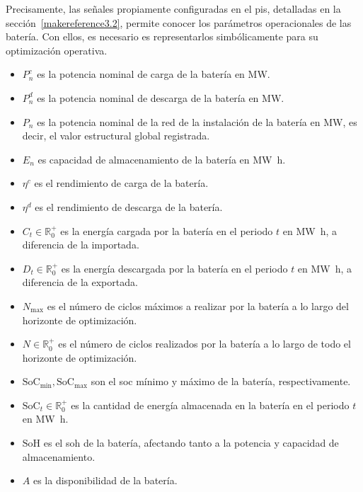 Precisamente, las señales propiamente configuradas en el \gls{pis}, detalladas en la sección~\ref{makereference3.2}, permite conocer los parámetros operacionales de las batería. Con ellos, es necesario es representarlos simbólicamente para su optimización operativa.

\begin{itemize}

  \item \( P^{c}_{n} \) es la potencia nominal de carga de la batería en \si{\mega\watt}.

  \item \( P^{d}_{n} \) es la potencia nominal de descarga de la batería en \si{\mega\watt}.

  \item \( P_{n} \) es la potencia nominal de la red de la instalación de la batería en \si{\mega\watt}, es decir, el valor estructural global registrada.

  \item \( E_{n} \) es capacidad de almacenamiento de la batería en \si{{\mega\watt\hour}}.

  \item \( \eta^{c} \) es el rendimiento de carga de la batería.

  \item \( \eta^{d} \) es el rendimiento de descarga de la batería.

  \item \( C_{t} \in \mathbb{R}^{+}_{0} \) es la energía cargada por la batería en el periodo \( t \) en \si{{\mega\watt\hour}}, a diferencia de la importada.

  \item \( D_{t} \in \mathbb{R}^{+}_{0} \) es la energía descargada por la batería en el periodo \( t \) en \si{{\mega\watt\hour}}, a diferencia de la exportada.

  \item \( N_{\text{max}} \) es el número de ciclos máximos a realizar por la batería a lo largo del horizonte de optimización.

  \item \( N \in \mathbb{R}^{+}_{0} \) es el número de ciclos realizados por la batería a lo largo de todo el horizonte de optimización.

  \item \( \text{SoC}_{\text{min}}, \text{SoC}_{\text{max}} \) son el \gls{soc} mínimo y máximo de la batería, respectivamente.

  \item \( \text{SoC}_{t} \in \mathbb{R}^{+}_{0} \) es la cantidad de energía almacenada en la batería en el periodo \( t \) en \si{{\mega\watt\hour}}.

  \item \( \text{SoH} \) es el \gls{soh} de la batería, afectando tanto a la potencia y capacidad de almacenamiento.

  \item \( A \) es la disponibilidad de la batería.

\end{itemize}


